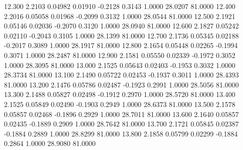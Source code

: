   12.300   2.2103   0.04982   0.01910  -0.2128   0.3143   1.0000  28.0207  81.0000
  12.400   2.2016   0.05058   0.01968  -0.2099   0.3132   1.0000  28.0544  81.0000
  12.500   2.1921   0.05146   0.02036  -0.2070   0.3120   1.0000  28.0940  81.0000
  12.600   2.1827   0.05242   0.02110  -0.2043   0.3105   1.0000  28.1399  81.0000
  12.700   2.1736   0.05345   0.02188  -0.2017   0.3089   1.0000  28.1917  81.0000
  12.800   2.1654   0.05448   0.02265  -0.1994   0.3071   1.0000  28.2487  81.0000
  12.900   2.1581   0.05550   0.02339  -0.1972   0.3052   1.0000  28.3095  81.0000
  13.000   2.1525   0.05643   0.02403  -0.1953   0.3032   1.0000  28.3734  81.0000
  13.100   2.1490   0.05722   0.02453  -0.1937   0.3011   1.0000  28.4393  81.0000
  13.200   2.1476   0.05786   0.02487  -0.1923   0.2991   1.0000  28.5056  81.0000
  13.300   2.1488   0.05827   0.02498  -0.1912   0.2970   1.0000  28.5720  81.0000
  13.400   2.1525   0.05849   0.02490  -0.1903   0.2949   1.0000  28.6373  81.0000
  13.500   2.1578   0.05857   0.02468  -0.1896   0.2929   1.0000  28.7011  81.0000
  13.600   2.1640   0.05857   0.02435  -0.1889   0.2909   1.0000  28.7642  81.0000
  13.700   2.1721   0.05845   0.02387  -0.1884   0.2889   1.0000  28.8299  81.0000
  13.800   2.1858   0.05799   0.02299  -0.1884   0.2864   1.0000  28.9080  81.0000
